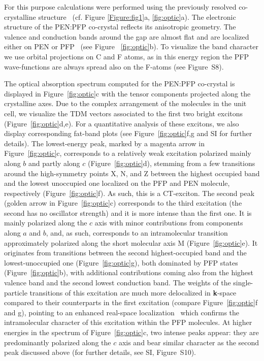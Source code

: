 \documentclass[journal=jpclcd,manuscript=letter]{achemso}
\begin{document}
For this purpose calculations were performed using the previously resolved co-crystalline structure~\cite{davi+20cm} (cf. Figure \ref{Figure:fig1}a, \ref{fig:optic}a).
The electronic structure of the PEN:PFP co-crystal  reflects its anisotropic geometry.
The valence and conduction bands around the gap are almost flat and are localized either on PEN or PFP~\cite{davi+20cm} (see Figure ~\ref{fig:optic}b). To visualize the band character we use orbital projections on C and F atoms, as in this energy region the PFP wave-functions are always spread also on the F-atoms (see Figure~S8).

The optical absorption spectrum computed for the PEN:PFP co-crystal is displayed in Figure~\ref{fig:optic}c with the tensor components projected along the crystalline axes.  
Due to the complex arrangement of the molecules in the unit cell, we visualize the TDM vectors associated to the first two bright excitons (Figure~\ref{fig:optic}d,e).
For a quantitative analysis of these excitons, we also display corresponding fat-band plots (see Figure~\ref{fig:optic}f,g and SI for further details).
The lowest-energy peak, marked by a magenta arrow in Figure~\ref{fig:optic}c, corresponds to a relatively weak excitation polarized mainly along $b$ and partly along $c$ (Figure~\ref{fig:optic}d), stemming from a few transitions around the high-symmetry points X, N, and Z between the highest occupied band and the lowest unoccupied one localized on the PFP and PEN molecule, respectively (Figure~\ref{fig:optic}f).
As such, this is a CT-exciton.
The second peak (golden arrow in Figure~\ref{fig:optic}c) corresponds to the third excitation (the second has no oscillator strength) and it is more intense than the first one. 
It is mainly polarized along the $c$ axis with minor contributions from components along $a$ and $b$, and, as such, corresponds to an intramolecular transition approximately polarized along the short molecular axis M (Figure~\ref{fig:optic}e).
It originates from transitions between the second highest-occupied band and the lowest-unoccupied one (Figure~\ref{fig:optic}g), both dominated by PFP states (Figure~\ref{fig:optic}b), with additional contributions coming also from the highest valence band and the second lowest conduction band.
The weights of the single-particle transitions of this excitation are much more delocalized in \textbf{k}-space compared to their counterparts in the first excitation (compare Figure~\ref{fig:optic}f and g), pointing to an enhanced real-space localization~\cite{cocc+18pccp,fu+17pccp} which confirms the intramolecular character of this excitation within the PFP molecules. 
At higher energies in the spectrum of Figure~\ref{fig:optic}c, two intense peaks appear: they are predominantly polarized along the $c$ axis and bear similar character as the second peak discussed above (for further details, see SI, Figure~S10).
\end{document}
